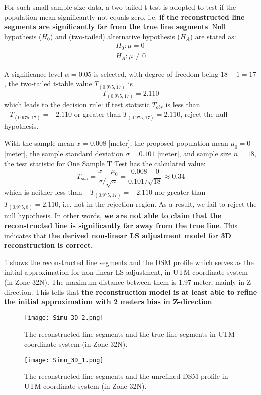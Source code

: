 For such small sample size data, a two-tailed t-test is adopted to test if the population mean significantly not equals zero, i.e. \textbf{if the reconstructed line segments are significantly far from the true line segments}. Null hypothesis ($H_0$) and (two-tailed) alternative hypothesis ($H_A$) are stated as:
\begin{equation*}
\begin{split}
H_0: \mu=0\\
H_A: \mu\neq0
\end{split}
\end{equation*}

A significance level $\alpha=0.05$ is selected, with degree of freedom being $18-1=17$, the two-tailed t-table value $T_{(0.975,17)}$ is
\begin{equation*}
T_{(0.975,17)}=2.110
\end{equation*}
which leads to the decision rule: if test statistic $T_{obs}$ is less than $-T_{(0.975,17)}=-2.110$ or greater than $T_{(0.975,17)}=2.110$, reject the null hypothesis.

With the sample mean $\overline{x}=0.008$ [meter],
the proposed population mean $\mu_0=0$ [meter],
the sample standard deviation $\sigma=0.101$ [meter],
and sample size $n=18$, the test statistic for One Sample T Test has the calculated value:
\begin{equation*}
T_{obs} = \frac{\overline{x}-\mu_0}{\sigma/\sqrt{n}}=\frac{0.008-0}{0.101/\sqrt{18}}\approx0.34
\end{equation*}
which is neither less than $-T_{(0.975,17)}=-2.110$ nor greater than $T_{(0.975,8)}=2.110$, i.e. not in the rejection region. As a result, we fail to reject the null hypothesis. In other words, \textbf{we are not able to claim that the reconstructed line is significantly far away from the true line}. This indicates that \textbf{the derived non-linear LS adjustment model for 3D reconstruction is correct}.

\cref{fig:Simu3D_1} shows the reconstructed line segments and the DSM profile which serves as the initial approximation for non-linear LS adjustment, in UTM coordinate system (in Zone 32N). The maximum distance between them is 1.97 meter, mainly in Z-direction. This tells that \textbf{the reconstruction model is at least able to refine the initial approximation with 2 meters bias in Z-direction}.

\begin{figure}
  \centering
  \texttt{[image: Simu\_3D\_2.png]} %
  \caption{\small The reconstructed line segments and the true line segments in UTM coordinate system (in Zone 32N).}
  \label{fig:Simu3D_2}
  \vspace{1cm}
  \centering
  \texttt{[image: Simu\_3D\_1.png]}
  \caption{\small The reconstructed line segments and the unrefined DSM profile in UTM coordinate system (in Zone 32N).}
  \label{fig:Simu3D_1}
\end{figure}

